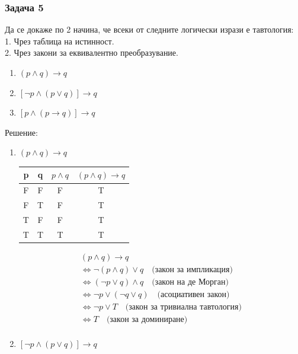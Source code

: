 \documentclass[fleqn, 12pt]{article}
\theoremstyle{definition}
\begin{document}
\subsubsection*{Задача 5}
Да се докаже по 2 начина, че всеки от следните логически изрази е тавтология:\\
1. Чрез таблица на истинност. \\
2. Чрез закони за еквивалентно преобразувание. \\
\begin{enumerate}
\item $(p \land q) \to q$
\item $[\neg p \land (p \lor q)] \to q$
\item $[p \land (p \to q)] \to q$
\end{enumerate}
Решение:
\begin{enumerate}
\item $(p \land q) \to q$
\begin{table}[htp]
  \begin{center}
    \begin{tabular}{|c|c|c|c|} 
\hline
      p & q  & $p \land q$  & $(p \land q) \to q$  \\
      \hline
	F & F & F & T \\
\hline
	F & T & F & T\\
\hline
	T & F & F  & T \\
\hline
 	T & T & T  & T \\
\hline
    \end{tabular}
  \end{center}
\end{table}
\begin{gather*}
(p \land q) \to q \\
\Leftrightarrow \neg(p \land q) \lor q \quad \text{(закон за импликация)} \\
\Leftrightarrow (\neg p \lor q) \land q \quad\text{(закон на де Морган)} \\
\Leftrightarrow \neg p \lor (\neg q \lor q) \quad \text{(асоциативен закон)} \\
\Leftrightarrow \neg p \lor T \quad \text{(закон за тривиална тавтология)} \\
\Leftrightarrow T \quad \text{(закон за доминиране)} \\
\end{gather*}
\item $[\neg p \land (p \lor q)] \to q$
\begin{table}[htp]
  \begin{center}
    \begin{tabular}{|c|c|c|c|c|c|} 

\end{tabular}
\end{center}
\end{table}
\end{enumerate}
\end{document}
